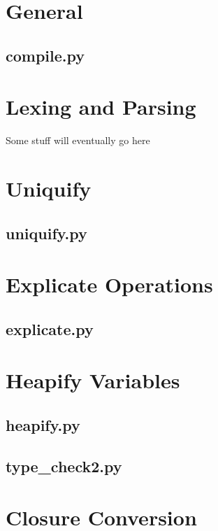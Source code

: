 \documentclass[a4paper,10pt]{article}
\title{}
\author{}
\date{}
\begin{document}
\section*{General}

\subsection{compile.py}


\clearpage
\section{Lexing and Parsing}
Some stuff will eventually go here

\clearpage
\section{Uniquify}

\subsection{uniquify.py}


\clearpage
\section{Explicate Operations}

\subsection{explicate.py}


\clearpage
\section{Heapify Variables}

\subsection{heapify.py}


\subsection{type\_check2.py}


\clearpage
\section{Closure Conversion}
\end{document}
